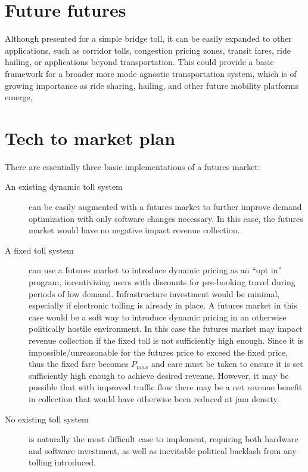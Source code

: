 \documentclass{article}
\begin{document}
\section{Future futures}
Although presented for a simple bridge toll, it can be easily expanded to other applications, such as corridor tolls, congestion pricing zones, transit fares, ride hailing, or applications beyond transportation. This could provide a basic framework for a broader more mode agnostic transportation system, which is of growing importance as ride sharing, hailing, and other future mobility platforms emerge, 

\section{Tech to market plan}
There are essentially three basic implementations of a futures market:
\begin{description}
    \item[An existing dynamic toll system] can be easily augmented with a futures market to further improve demand optimization with only software changes necessary. In this case, the futures market would have no negative impact revenue collection. 
    
    \item[A fixed toll system] can use a futures market to introduce dynamic pricing as an ``opt in'' program, incentivizing users with discounts for pre-booking travel during periods of low demand. Infrastructure investment would be minimal, especially if electronic tolling is already in place. A futures market in this case would be a soft way to introduce dynamic pricing in an otherwise politically hostile environment. In this case the futures market may impact revenue collection if the fixed toll is not sufficiently high enough. Since it is impossible/unreasonable for the futures price to exceed the fixed price, thus the fixed fare becomes $P_{max}$ and care must be taken to ensure it is set sufficiently high enough to achieve desired revenue. However, it may be possible that with improved traffic flow there may be a net revenue benefit in collection that would have otherwise been reduced at jam density.
    
    \item[No existing toll system] is naturally the most difficult case to implement, requiring both hardware and software investment, as well as inevitable political backlash from any tolling introduced.
\end{description}
\end{document}
